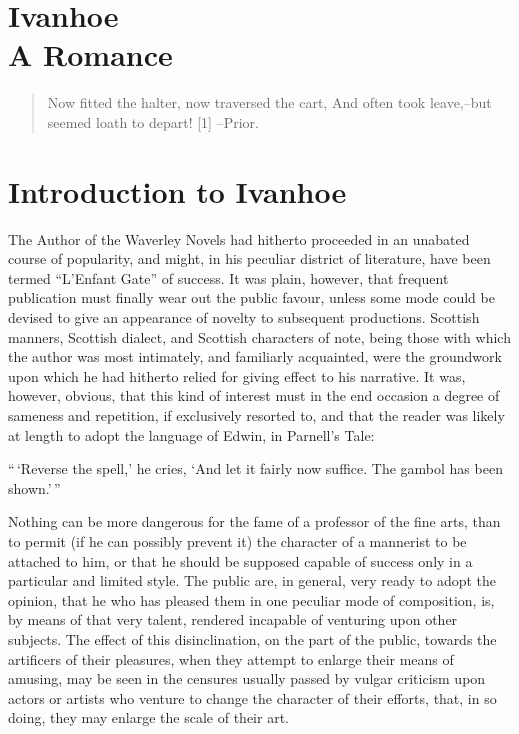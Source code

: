 \chapter*{Ivanhoe\\
    A Romance}

\begin{quote}
Now fitted the halter, now traversed the cart,
And often took leave,--but seemed loath to depart! [1]
--Prior.
\end{quote}

\chapter{Introduction to Ivanhoe}

The Author of the Waverley Novels had hitherto proceeded in an unabated
course of popularity, and might, in his peculiar district of literature,
have been termed ``L'Enfant Gate'' of success. It was plain, however,
that frequent publication must finally wear out the public favour,
unless some mode could be devised to give an appearance of novelty to
subsequent productions. Scottish manners, Scottish dialect, and Scottish
characters of note, being those with which the author was most
intimately, and familiarly acquainted, were the groundwork upon which he
had hitherto relied for giving effect to his narrative. It was, however,
obvious, that this kind of interest must in the end occasion a degree of
sameness and repetition, if exclusively resorted to, and that the reader
was likely at length to adopt the language of Edwin, in Parnell's Tale:

``\,`Reverse the spell,' he cries, `And let it fairly now suffice. The
gambol has been shown.'\,''

Nothing can be more dangerous for the fame of a professor of the fine
arts, than to permit (if he can possibly prevent it) the character of a
mannerist to be attached to him, or that he should be supposed capable
of success only in a particular and limited style. The public are, in
general, very ready to adopt the opinion, that he who has pleased them
in one peculiar mode of composition, is, by means of that very talent,
rendered incapable of venturing upon other subjects. The effect of this
disinclination, on the part of the public, towards the artificers of
their pleasures, when they attempt to enlarge their means of amusing,
may be seen in the censures usually passed by vulgar criticism upon
actors or artists who venture to change the character of their efforts,
that, in so doing, they may enlarge the scale of their art.

